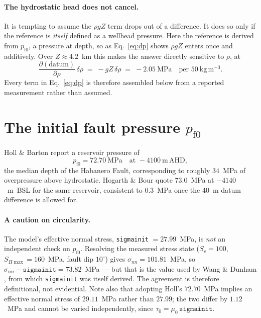 \documentclass[11pt]{article}
\newcommand{\code}[1]{\texttt{#1}}
\newcommand{\pfz}{p_{\mathrm{f}0}}
\begin{document}
\paragraph{The hydrostatic head does not cancel.}
It is tempting to assume the $\rho g Z$ term drops out of a difference. It does
so only if the reference is \emph{itself} defined as a wellhead pressure. Here
the reference is derived from $\pfz$, a pressure at depth, so as
Eq.~\eqref{eq:dp} shows $\rho g Z$ enters once and additively. Over
$Z \approx 4.2$~km this makes the answer directly sensitive to $\rho$, at
\begin{equation}
  \frac{\partial (\text{datum})}{\partial \rho} \, \delta\rho
  \;=\; -g Z \, \delta\rho
  \;=\; -2.05~\mathrm{MPa} \quad \text{per } 50~\mathrm{kg\,m^{-3}} .
  \label{eq:sens}
\end{equation}
Every term in Eq.~\eqref{eq:dp} is therefore assembled below from a reported
measurement rather than assumed.

\section{The initial fault pressure $\pfz$}

Holl \& Barton \cite{holl2015} report a reservoir pressure of
\begin{equation}
  \pfz = 72.70~\mathrm{MPa} \quad \text{at } -4100~\mathrm{m\,AHD},
\end{equation}
the median depth of the Habanero Fault, corresponding to roughly $34$~MPa of
overpressure above hydrostatic. Hogarth \& Bour \cite{hogarth2015} quote
$73.0$~MPa at $-4140$~m~BSL for the same reservoir, consistent to $0.3$~MPa
once the $40$~m datum difference is allowed for.

\paragraph{A caution on circularity.}
The model's effective normal stress, \code{sigmainit} $=27.99$~MPa, is
\emph{not} an independent check on $\pfz$. Resolving the measured stress state
($S_v = 100$, $S_{H\max} = 160$~MPa, fault dip $10^\circ$) gives
$\sigma_{nn} = 101.81$~MPa, so $\sigma_{nn} - \code{sigmainit} = 73.82$~MPa ---
but that is the value used by Wang \& Dunham \cite{wang2022}, from which
\code{sigmainit} was itself derived. The agreement is therefore definitional,
not evidential. Note also that adopting Holl's $72.70$~MPa implies an effective
normal stress of $29.11$~MPa rather than $27.99$; the two differ by
$1.12$~MPa and cannot be varied independently, since
$\tau_0 = \mu_0\,\code{sigmainit}$.
\end{document}
